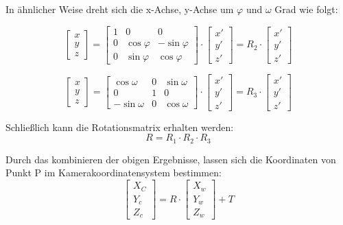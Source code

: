 In ähnlicher Weise dreht sich die x-Achse, y-Achse um $\varphi$ und $\omega$ Grad wie folgt:

\begin{equation}
   \begin{bmatrix}
	x \\  
	y \\
	z
	\end{bmatrix} = \begin{bmatrix}
		1   & 0          & 0	\\
		0   & \cos\varphi & -\sin\varphi	\\
	    0   & \sin\varphi& \cos\varphi	
	\end{bmatrix} \cdot \begin{bmatrix}
	x' \\  
	y' \\
	z'
	\end{bmatrix}= R_2 \cdot \begin{bmatrix}
	x' \\  
	y' \\
	z'
	\end{bmatrix}
\end{equation}

\begin{equation}
   \begin{bmatrix}
	x \\  
	y \\
	z
	\end{bmatrix} = \begin{bmatrix}
	\cos\omega  & 0           & \sin\omega	\\		
	0    	    & 1           & 0	\\
	-\sin\omega &0            &  \cos\omega
	\end{bmatrix} \cdot \begin{bmatrix}
	x' \\  
	y' \\
	z'
	\end{bmatrix}= R_3 \cdot \begin{bmatrix}
	x' \\  
	y' \\
	z'
	\end{bmatrix}
\end{equation}

Schließlich kann die Rotationsmatrix erhalten werden:
\begin{equation}
   R = R_1 \cdot R_2 \cdot R_3
\end{equation}

Durch das kombinieren der obigen Ergebnisse, lassen sich die Koordinaten von Punkt P im Kamerakoordinatensystem bestimmen:
\begin{equation}
   \begin{bmatrix}
	X_C \\  
	Y_c \\
	Z_c
	\end{bmatrix} = R \cdot \begin{bmatrix}
	X_w \\  
	Y_w \\
	Z_w 
	\end{bmatrix} +T
\end{equation}

